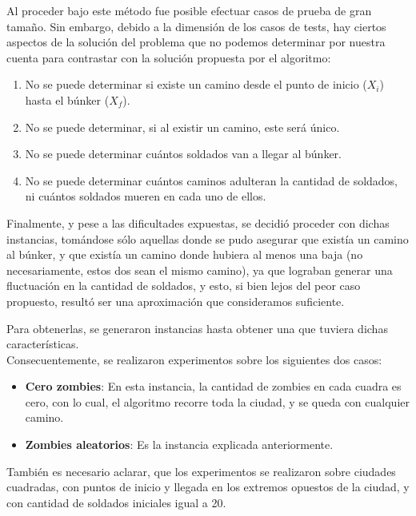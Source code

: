 Al proceder bajo este m\'etodo fue posible efectuar casos de prueba de gran tamaño. Sin embargo, debido a la dimensi\'on de los casos de tests, hay ciertos aspectos de la soluci\'on del problema que no podemos determinar por nuestra cuenta para contrastar con la soluci\'on propuesta por el algoritmo:

\begin{enumerate}
	\item No se puede determinar si existe un camino desde el punto de inicio ($X_i$) hasta el búnker ($X_f$).
	\item No se puede determinar, si al existir un camino, este será único. 
	\item No se puede determinar cu\'antos soldados van a llegar al búnker.
	\item No se puede determinar cu\'antos caminos adulteran la cantidad de soldados, ni cu\'antos soldados mueren en cada uno de ellos.
\end{enumerate}

\bigskip
\bigskip


Finalmente, y pese a las dificultades expuestas, se decidió proceder con dichas instancias, tom\'andose s\'olo aquellas donde se pudo asegurar que existía un camino al búnker, y que existía un camino donde hubiera al menos una baja (no necesariamente, estos dos sean el mismo camino), ya que lograban generar una fluctuación en la cantidad de soldados, y esto, si bien lejos del peor caso propuesto, resultó ser una aproximación que consideramos suficiente.

Para obtenerlas, se generaron instancias hasta obtener una que tuviera dichas características.\\

Consecuentemente, se realizaron experimentos sobre los siguientes dos casos:
\begin{itemize}
	\item \textbf{Cero zombies}: En esta instancia, la cantidad de zombies en cada cuadra es cero, con lo cual, el algoritmo recorre toda la ciudad, y se queda con cualquier camino.
	\item \textbf{Zombies aleatorios}: Es la instancia explicada anteriormente.
\end{itemize}

También es necesario aclarar, que los experimentos se realizaron sobre ciudades cuadradas, con puntos de inicio y llegada en los extremos opuestos de la ciudad, y con cantidad de soldados iniciales igual a 20. 

